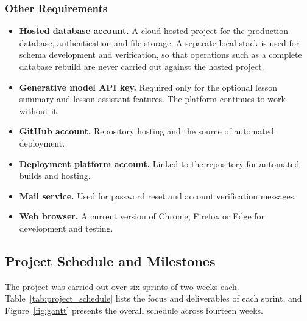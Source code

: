 \documentclass[12pt, oneside]{article} %
\begin{document}
\subsubsection{Other Requirements}

\begin{itemize}
    \item \textbf{Hosted database account.} A cloud-hosted project for the production database, authentication and file storage. A separate local stack is used for schema development and verification, so that operations such as a complete database rebuild are never carried out against the hosted project.
    \item \textbf{Generative model API key.} Required only for the optional lesson summary and lesson assistant features. The platform continues to work without it.
    \item \textbf{GitHub account.} Repository hosting and the source of automated deployment.
    \item \textbf{Deployment platform account.} Linked to the repository for automated builds and hosting.
    \item \textbf{Mail service.} Used for password reset and account verification messages.
    \item \textbf{Web browser.} A current version of Chrome, Firefox or Edge for development and testing.
\end{itemize}

\subsection{Project Schedule and Milestones}

The project was carried out over six sprints of two weeks each. Table~\ref{tab:project_schedule} lists the focus and deliverables of each sprint, and Figure~\ref{fig:gantt} presents the overall schedule across fourteen weeks.
\end{document}
